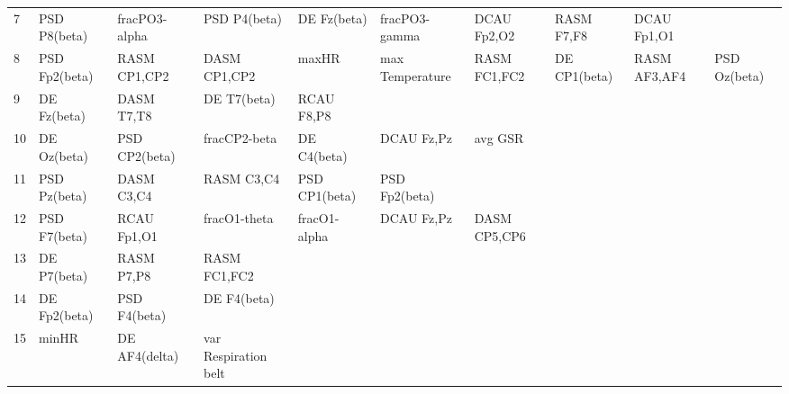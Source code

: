 \begin{landscape}
\begin{table}[]
\begin{tabular}{l|llllllll}
7        & PSD P8(beta)          & fracPO3-alpha         & PSD P4(beta)         & DE Fz(beta)             & fracPO3-gamma           & DCAU Fp2,O2          & RASM F7,F8           & DCAU Fp1,O1           &                       &                    \\
8        & PSD Fp2(beta)         & RASM CP1,CP2          & DASM CP1,CP2         & maxHR                   & max Temperature         & RASM FC1,FC2         & DE CP1(beta)         & RASM AF3,AF4          & PSD Oz(beta)          &                    \\
9        & DE Fz(beta)           & DASM T7,T8            & DE T7(beta)          & RCAU F8,P8              &                         &                      &                      &                       &                       &                    \\
10       & DE Oz(beta)           & PSD CP2(beta)         & fracCP2-beta         & DE C4(beta)             & DCAU Fz,Pz              & avg GSR              &                      &                       &                       &                    \\
11       & PSD Pz(beta)          & DASM C3,C4            & RASM C3,C4           & PSD CP1(beta)           & PSD Fp2(beta)           &                      &                      &                       &                       &                    \\
12       & PSD F7(beta)          & RCAU Fp1,O1           & fracO1-theta         & fracO1-alpha            & DCAU Fz,Pz              & DASM CP5,CP6         &                      &                       &                       &                    \\
13       & DE P7(beta)           & RASM P7,P8            & RASM FC1,FC2         &                         &                         &                      &                      &                       &                       &                    \\
14       & DE Fp2(beta)          & PSD F4(beta)          & DE F4(beta)          &                         &                         &                      &                      &                       &                       &                    \\
15       & minHR                 & DE AF4(delta)         & var Respiration belt &                         &                         &                      &                      &                       &                       &                    \\

\end{tabular}
\end{table}
\end{landscape}
